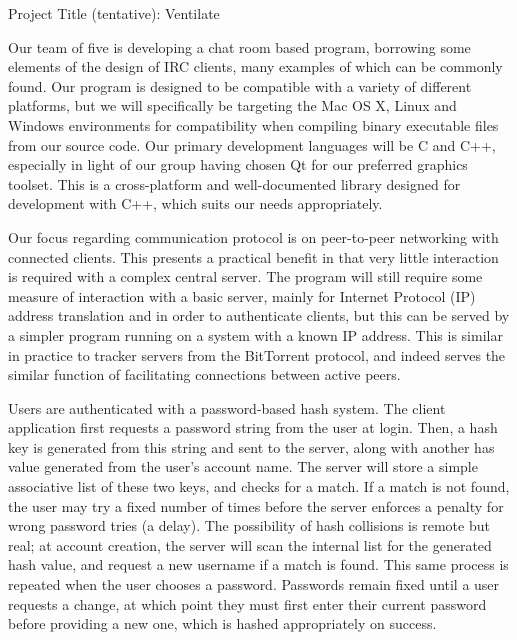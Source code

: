 \documentclass[12pt]{report}
\begin{document}
\begin{flushleft}

\begin{center}
Project Title (tentative): Ventilate
\end{center}

\setlength{\parindent}{1.27cm}

\indent \indent Our team of five is developing a chat room based program, borrowing some elements of the design of IRC clients, many examples of which can be commonly found. Our program is designed to be compatible with a variety of different platforms, but we will specifically be targeting the Mac OS X, Linux and Windows environments for compatibility when compiling binary executable files from our source code. Our primary development languages will be C and C++, especially in light of our group having chosen Qt for our preferred graphics toolset. This is a cross-platform and well-documented library designed for development with C++, which suits our needs appropriately.

\indent Our focus regarding communication protocol is on peer-to-peer networking with connected clients. This presents a practical benefit in that very little interaction is required with a complex central server. The program will still require some measure of interaction with a basic server, mainly for Internet Protocol (IP) address translation and in order to authenticate clients, but this can be served by a simpler program running on a system with a known IP address. This is similar in practice to tracker servers from the BitTorrent protocol, and indeed serves the similar function of facilitating connections between active peers.

\indent Users are authenticated with a password-based hash system. The client application first requests a password string from the user at login. Then, a hash key is generated from this string and sent to the server, along with another has value generated from the user's account name. The server will store a simple associative list of these two keys, and checks for a match. If a match is not found, the user may try a fixed number of times before the server enforces a penalty for wrong password tries (a delay). The possibility of hash collisions is remote but real; at account creation, the server will scan the internal list for the generated hash value, and request a new username if a match is found. This same process is repeated when the user chooses a password. Passwords remain fixed until a user requests a change, at which point they must first enter their current password before providing a new one, which is hashed appropriately on success.%


\end{flushleft}
\end{document}
